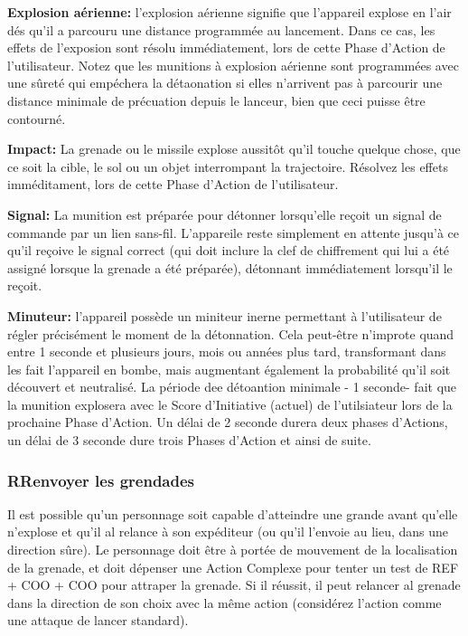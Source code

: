 \textbf{Explosion aérienne:} l'explosion aérienne signifie que l'appareil explose en l'air dés qu'il a parcouru une distance programmée au lancement. Dans ce cas, les effets de l'exposion sont résolu immédiatement, lors de cette Phase d'Action de l'utilisateur. Notez que les munitions à explosion aérienne sont programmées avec une sûreté qui empéchera la détaonation si elles n'arrivent pas à parcourir une distance minimale de précuation depuis le lanceur, bien que ceci puisse être contourné. 

\textbf{Impact:} La grenade ou le missile explose aussitôt qu'il touche quelque chose, que ce soit la cible, le sol ou un objet interrompant la trajectoire. Résolvez les effets imméditament, lors de cette Phase d'Action de l'utilisateur. 

\textbf{Signal:} La munition est préparée pour détonner lorsqu'elle reçoit un signal de commande par un lien sans-fil. L'appareile reste simplement en attente jusqu'à ce qu'il reçoive le signal correct (qui doit inclure la clef de chiffrement qui lui a été assigné lorsque la grenade a été préparée), détonnant immédiatement lorsqu'il le reçoit. 

\textbf{Minuteur:} l'appareil possède un miniteur inerne permettant à l'utilisateur de régler précisément le moment de la détonnation. Cela peut-être n'improte quand entre 1 seconde et plusieurs jours, mois ou années plus tard, transformant dans les fait l'appareil en bombe, mais augmentant également la probabilité qu'il soit découvert et neutralisé. La période dee détoantion minimale - 1 seconde- fait que la munition explosera avec le Score d'Initiative (actuel) de l'utilsiateur lors de la prochaine Phase d'Action. Un délai de 2 seconde durera deux phases d'Actions, un délai de 3 seconde dure trois Phases d'Action et ainsi de suite. 

\subsubsection{RRenvoyer les grendades} 

Il est possible qu'un personnage soit capable d'atteindre une grande avant qu'elle n'explose et qu'il al relance à son expéditeur (ou qu'il l'envoie au lieu, dans une direction sûre). Le personnage doit être à portée de mouvement de la localisation de la grenade, et doit dépenser une Action Complexe pour tenter un test de REF + COO + COO pour attraper la grenade. Si il réussit, il peut relancer al grenade dans la direction de son choix avec la même action (considérez l'action comme une attaque de lancer standard). 

